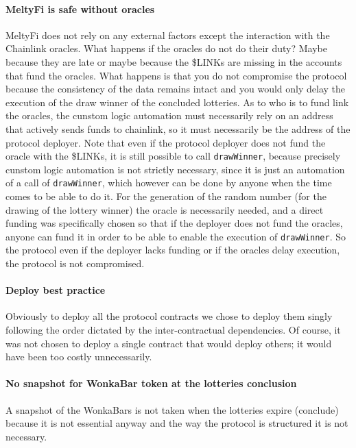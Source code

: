 \paragraph{MeltyFi is safe without oracles} 
MeltyFi does not rely on any external factors except the interaction with the Chainlink oracles. What happens if the oracles do not do their duty? Maybe because they are late or maybe because the \$LINKs are missing in the accounts that fund the oracles. What happens is that you do not compromise the protocol because the consistency of the data remains intact and you would only delay the execution of the draw winner of the concluded lotteries. As to who is to fund link the oracles, the cunstom logic automation \cite{oracleautomation} must necessarily rely on an address that actively sends funds to chainlink, so it must necessarily be the address of the protocol deployer. Note that even if the protocol deployer does not fund the oracle with the \$LINKs, it is still possible to call \texttt{drawWinner}, because precisely cunstom logic automation is not strictly necessary, since it is just an automation of a call of \texttt{drawWinner}, which however can be done by anyone when the time comes to be able to do it. For the generation of the random number (for the drawing of the lottery winner) the oracle is necessarily needed, and a direct funding \cite{oraclerandom} was specifically chosen so that if the deployer does not fund the oracles, anyone can fund it in order to be able to enable the execution of \texttt{drawWinner}. So the protocol even if the deployer lacks funding or if the oracles delay execution, the protocol is not compromised.

\paragraph{Deploy best practice}
Obviously to deploy all the protocol contracts we chose to deploy them singly following the order dictated by the inter-contractual dependencies. Of course, it was not chosen to deploy a single contract that would deploy others; it would have been too costly unnecessarily.

\paragraph{No snapshot for WonkaBar token at the lotteries conclusion}
A snapshot of the WonkaBars is not taken when the lotteries expire (conclude) because it is not essential anyway and the way the protocol is structured it is not necessary.
